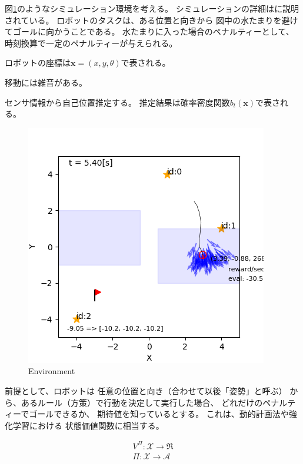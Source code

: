 \documentclass{jarticle}
\newcommand{\V}[1]{\boldsymbol{#1}}
\begin{document}
図\ref{fig:environment}のようなシミュレーション環境を考える。
シミュレーションの詳細は\cite{上田2019}に説明されている。
ロボットのタスクは、ある位置と向きから
図中の水たまりを避けてゴールに向かうことである。
水たまりに入った場合のペナルティーとして、
時刻換算で一定のペナルティーが与えられる。

ロボットの座標は$\V{x} = (x,y,\theta)$で表される。

移動には雑音がある。

センサ情報から自己位置推定する。
推定結果は確率密度関数$b_t(\V{x})$で表される。


\begin{figure}[tbh]
 \centering
  \includegraphics[width=1.0\linewidth]{figs/puddle_world.png}
  \vspace*{-4mm}
  \caption{Environment}
  \label{fig:environment}
\end{figure}

前提として、ロボットは
任意の位置と向き（合わせて以後「姿勢」と呼ぶ）
から、あるルール（方策）で行動を決定して実行した場合、
どれだけのペナルティーでゴールできるか、
期待値を知っているとする。
これは、動的計画法や強化学習における
状態価値関数に相当する。

\begin{align}
	V^\Pi: \mathcal{X} \to \Re \\
	\Pi: \mathcal{X} \to \mathcal{A}
\end{align}
\end{document}
